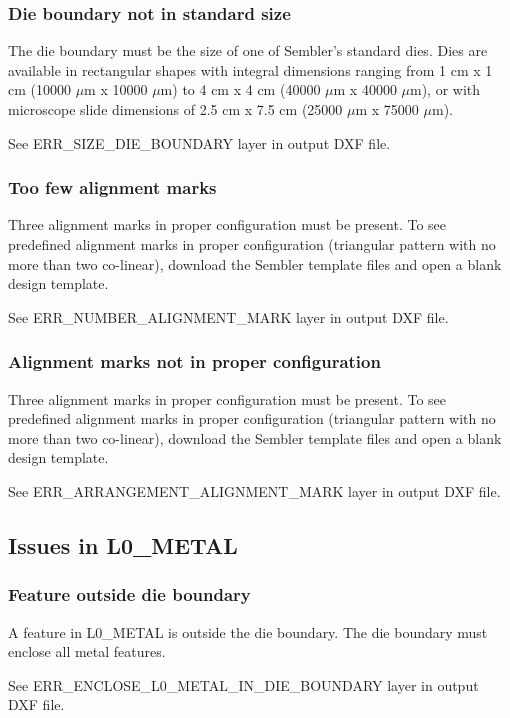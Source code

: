 \documentclass[twoside]{article}
\begin{document}
\subsubsection{Die boundary not in standard size}
\par The die boundary must be the size of one of Sembler's standard dies. Dies
are available in rectangular shapes with integral dimensions ranging from 1 cm x
1 cm (10000 $\mu$m x 10000 $\mu$m) to 4 cm x 4 cm (40000 $\mu$m x 40000 $\mu$m),
or with microscope slide dimensions of 2.5 cm x 7.5 cm (25000 $\mu$m x 75000
$\mu$m).  \par See ERR\_SIZE\_DIE\_BOUNDARY layer in output DXF file.

\subsubsection{Too few alignment marks}
\par Three alignment marks in proper configuration must be present. To see
predefined alignment marks in proper configuration (triangular pattern with no
more than two co-linear), download the Sembler template files and open a blank
design template.  \par See ERR\_NUMBER\_ALIGNMENT\_MARK layer in output DXF
file.

\subsubsection{Alignment marks not in proper configuration}
\par Three alignment marks in proper configuration must be present. To see
predefined alignment marks in proper configuration (triangular pattern with no
more than two co-linear), download the Sembler template files and open a blank
design template.  \par See ERR\_ARRANGEMENT\_ALIGNMENT\_MARK layer in output DXF
file.

\subsection{Issues in L0\_METAL}

\subsubsection{Feature outside die boundary}
\par A feature in L0\_METAL is outside the die boundary. The die boundary must
enclose all metal features.  \par See ERR\_ENCLOSE\_L0\_METAL\_IN\_DIE\_BOUNDARY
layer in output DXF file.
\end{document}
